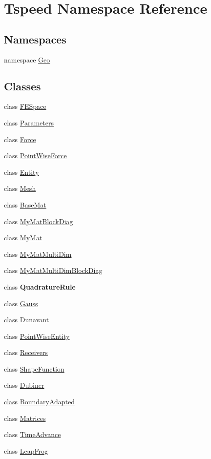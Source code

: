 \hypertarget{namespaceTspeed}{\section{Tspeed Namespace Reference}
\label{namespaceTspeed}
}
\subsection*{Namespaces}
\begin{DoxyCompactItemize}
\item 
namespace \hyperlink{namespaceTspeed_1_1Geo}{Geo}
\end{DoxyCompactItemize}
\subsection*{Classes}
\begin{DoxyCompactItemize}
\item 
class \hyperlink{classTspeed_1_1FESpace}{F\-E\-Space}
\item 
class \hyperlink{classTspeed_1_1Parameters}{Parameters}
\item 
class \hyperlink{classTspeed_1_1Force}{Force}
\item 
class \hyperlink{classTspeed_1_1PointWiseForce}{Point\-Wise\-Force}
\item 
class \hyperlink{classTspeed_1_1Entity}{Entity}
\item 
class \hyperlink{classTspeed_1_1Mesh}{Mesh}
\item 
class \hyperlink{classTspeed_1_1BaseMat}{Base\-Mat}
\item 
class \hyperlink{classTspeed_1_1MyMatBlockDiag}{My\-Mat\-Block\-Diag}
\item 
class \hyperlink{classTspeed_1_1MyMat}{My\-Mat}
\item 
class \hyperlink{classTspeed_1_1MyMatMultiDim}{My\-Mat\-Multi\-Dim}
\item 
class \hyperlink{classTspeed_1_1MyMatMultiDimBlockDiag}{My\-Mat\-Multi\-Dim\-Block\-Diag}
\item 
class {\bfseries Quadrature\-Rule}
\item 
class \hyperlink{classTspeed_1_1Gauss}{Gauss}
\item 
class \hyperlink{classTspeed_1_1Dunavant}{Dunavant}
\item 
class \hyperlink{classTspeed_1_1PointWiseEntity}{Point\-Wise\-Entity}
\item 
class \hyperlink{classTspeed_1_1Receivers}{Receivers}
\item 
class \hyperlink{classTspeed_1_1ShapeFunction}{Shape\-Function}
\item 
class \hyperlink{classTspeed_1_1Dubiner}{Dubiner}
\item 
class \hyperlink{classTspeed_1_1BoundaryAdapted}{Boundary\-Adapted}
\item 
class \hyperlink{classTspeed_1_1Matrices}{Matrices}
\item 
class \hyperlink{classTspeed_1_1TimeAdvance}{Time\-Advance}
\item 
class \hyperlink{classTspeed_1_1LeapFrog}{Leap\-Frog}
\end{DoxyCompactItemize}
